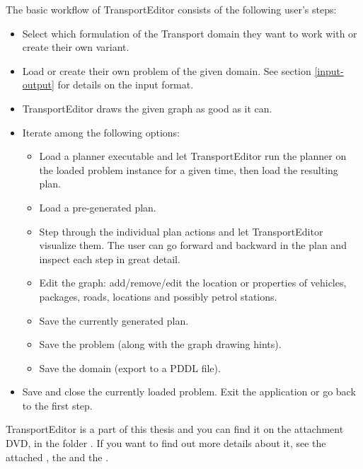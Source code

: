 The basic workflow of TransportEditor consists of the following user's steps:
\begin{itemize}
\item Select which formulation of the Transport domain they want to work with or create their own variant.
\item Load or create their own problem of the given domain. See section \ref{input-output} for details on the input format.
\item TransportEditor draws the given graph as good as it can.
\item Iterate among the following options:
\begin{itemize}
\item Load a planner executable and let TransportEditor run the planner on the loaded problem instance for a given time, then load the resulting plan.
\item Load a pre-generated plan.
\item Step through the individual plan actions and let TransportEditor visualize them.
The user can go forward and backward in the plan and inspect each step in great detail.
\item Edit the graph: add/remove/edit the location or properties of vehicles, packages, roads, locations and possibly petrol stations.
\item Save the currently generated plan.
\item Save the problem (along with the graph drawing hints).
\item Save the domain (export to a PDDL file).
\end{itemize}
\item Save and close the currently loaded problem. Exit the application or go back to the first step.
\end{itemize}

TransportEditor is a part of this thesis and you can find it on the attachment DVD, in the folder . If you want to find out more details about it, see the attached ,
the 
and the .
